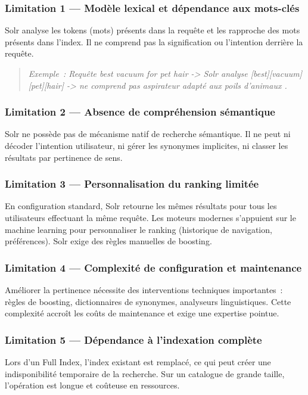 \subsubsection{Limitation 1 — Modèle lexical et dépendance aux mots-clés}
Solr analyse les tokens (mots) présents dans la requête et les rapproche des mots présents dans l'index. Il ne comprend pas la signification ou l'intention derrière la requête.

\begin{quote}
\textit{Exemple~: Requête \og best vacuum for pet hair \fg{} -> Solr analyse [best][vacuum][pet][hair] -> ne comprend pas \og aspirateur adapté aux poils d'animaux \fg{}.}
\end{quote}

\subsubsection{Limitation 2 — Absence de compréhension sémantique}
Solr ne possède pas de mécanisme natif de recherche sémantique. Il ne peut ni décoder l'intention utilisateur, ni gérer les synonymes implicites, ni classer les résultats par pertinence de sens.

\subsubsection{Limitation 3 — Personnalisation du ranking limitée}
En configuration standard, Solr retourne les mêmes résultats pour tous les utilisateurs effectuant la même requête. Les moteurs modernes s'appuient sur le machine learning pour personnaliser le ranking (historique de navigation, préférences). Solr exige des règles manuelles de boosting.

\subsubsection{Limitation 4 — Complexité de configuration et maintenance}
Améliorer la pertinence nécessite des interventions techniques importantes~: règles de boosting, dictionnaires de synonymes, analyseurs linguistiques. Cette complexité accroît les coûts de maintenance et exige une expertise pointue.

\subsubsection{Limitation 5 — Dépendance à l'indexation complète}
Lors d'un Full Index, l'index existant est remplacé, ce qui peut créer une indisponibilité temporaire de la recherche. Sur un catalogue de grande taille, l'opération est longue et coûteuse en ressources.

